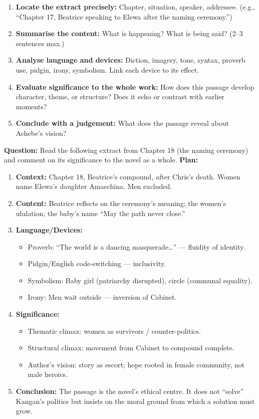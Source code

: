 \documentclass[11pt]{article}
\begin{document}
\begin{methode}
\begin{enumerate}
\item \textbf{Locate the extract precisely:} Chapter, situation, speaker, addressee. (e.g., “Chapter 17, Beatrice speaking to Elewa after the naming ceremony.”)
\item \textbf{Summarise the content:} What is happening? What is being said? (2–3 sentences max.)
\item \textbf{Analyse language and devices:} Diction, imagery, tone, syntax, proverb use, pidgin, irony, symbolism. Link each device to its effect.
\item \textbf{Evaluate significance to the whole work:} How does this passage develop character, theme, or structure? Does it echo or contrast with earlier moments?
\item \textbf{Conclude with a judgement:} What does the passage reveal about Achebe’s vision?
\end{enumerate}
\end{methode}

\begin{exemplebox}
\textbf{Question:} Read the following extract from Chapter 18 (the naming ceremony) and comment on its significance to the novel as a whole.
\textbf{Plan:}
\begin{enumerate}
\item \textbf{Context:} Chapter 18, Beatrice’s compound, after Chris’s death. Women name Elewa’s daughter Amaechina. Men excluded.
\item \textbf{Content:} Beatrice reflects on the ceremony’s meaning; the women’s ululation; the baby’s name “May the path never close.”
\item \textbf{Language/Devices:}
\begin{itemize}
\item Proverb: “The world is a dancing masquerade…” — fluidity of identity.
\item Pidgin/English code-switching — inclusivity.
\item Symbolism: Baby girl (patriarchy disrupted), circle (communal equality).
\item Irony: Men wait outside — inversion of Cabinet.
\end{itemize}
\item \textbf{Significance:}
\begin{itemize}
\item Thematic climax: women as survivors / counter-politics.
\item Structural climax: movement from Cabinet to compound complete.
\item Author’s vision: story as escort; hope rooted in female community, not male heroics.
\end{itemize}
\item \textbf{Conclusion:} The passage is the novel’s ethical centre. It does not “solve” Kangan’s politics but insists on the moral ground from which a solution must grow.
\end{enumerate}
\end{exemplebox}
\end{document}
